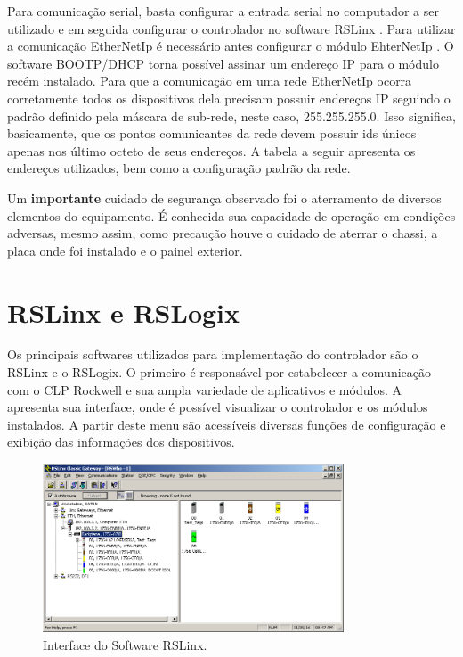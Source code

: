 Para comunicação serial, basta configurar a entrada serial no computador a ser utilizado e em seguida configurar o controlador no software RSLinx \cite{rslinx}. Para utilizar a comunicação EtherNetIp é necessário antes configurar o módulo EhterNetIp \cite{ethernetmodule}. O software BOOTP/DHCP torna possível assinar um endereço IP para o módulo recém instalado. Para que a comunicação em uma rede EtherNetIp ocorra corretamente todos os dispositivos dela precisam possuir endereços IP seguindo o padrão definido pela máscara de sub-rede, neste caso, 255.255.255.0. Isso significa, basicamente, que os pontos comunicantes da rede devem possuir ids únicos apenas nos último octeto de seus endereços. A tabela a seguir apresenta os endereços utilizados, bem como a configuração padrão da rede.

\begin{table}[!ht]
	\caption{IPs dos dispositivos}
	\label{tabIPs}
	\small
	\centering
\end{table}

Um \textbf{importante} cuidado de segurança observado foi o aterramento de diversos elementos do equipamento. É conhecida sua capacidade de operação em condições adversas, mesmo assim, como precaução houve o cuidado de aterrar o chassi, a placa onde foi instalado e o painel exterior.

\section{RSLinx e RSLogix}
Os principais softwares utilizados para implementação do controlador são o RSLinx e o RSLogix. O primeiro é responsável por estabelecer a comunicação com o CLP Rockwell e sua ampla variedade de aplicativos e módulos. A  apresenta sua interface, onde é possível visualizar o controlador e os módulos instalados. A partir deste menu são acessíveis diversas funções de configuração e exibição das informações dos dispositivos.

\begin{figure}[H]
	\centering
	\includegraphics[height=5cm,keepaspectratio]{img/RSLinx.png}
	\caption{Interface do Software RSLinx.}
	\label{imgRSLinx}
\end{figure}

